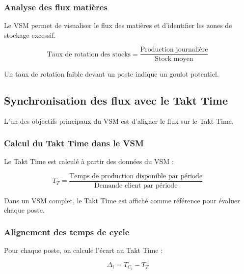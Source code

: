 \documentclass[12pt,a4paper]{article}
\begin{document}
\subsubsection{Analyse des flux matières}

Le VSM permet de visualiser le flux des matières et d'identifier les zones de stockage excessif.

\[
\text{Taux de rotation des stocks} = \frac{\text{Production journalière}}{\text{Stock moyen}}
\]

Un taux de rotation faible devant un poste indique un goulot potentiel.

\subsection{Synchronisation des flux avec le Takt Time}

L'un des objectifs principaux du VSM est d'aligner le flux sur le Takt Time.

\subsubsection{Calcul du Takt Time dans le VSM}

Le Takt Time est calculé à partir des données du VSM :

\[
\boxed{T_T = \frac{\text{Temps de production disponible par période}}{\text{Demande client par période}}}
\]

Dans un VSM complet, le Takt Time est affiché comme référence pour évaluer chaque poste.

\subsubsection{Alignement des temps de cycle}

Pour chaque poste, on calcule l'écart au Takt Time :

\[
\Delta_i = T_{C_i} - T_T
\]

\begin{center}
\end{center}
\end{document}
